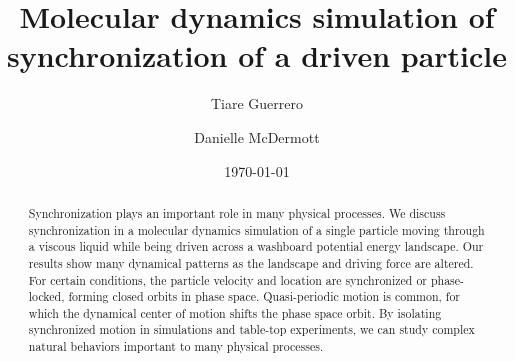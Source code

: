 \documentclass[preprint,showpacs,preprintnumbers,amsmath,amssymb,aps,prb]{revtex4-1}
\theoremstyle{remark}
\begin{document}
\title{Molecular dynamics simulation of synchronization of a  driven particle}
 
\author{Tiare Guerrero}

\author{Danielle McDermott}

\date{\today}

\begin{abstract}
  Synchronization
  plays an important role in many physical processes.
  We discuss synchronization in a 
  molecular dynamics simulation
  of a single particle
  moving through
  a viscous liquid
  while being driven 
  across a washboard potential energy landscape.
  Our results show many dynamical patterns
  as the landscape and driving force are altered.
  For certain conditions,
  the particle velocity and location
  are synchronized or 
  phase-locked,
  forming closed orbits in phase space.
  Quasi-periodic motion is common, 
  for which the
  dynamical center of motion shifts the
  phase space orbit.
  By 
  isolating
  synchronized motion
  in 
  simulations and table-top experiments,
  we 
  can study %
  complex natural behaviors
  important to many physical processes.
\end{abstract}

\maketitle 
\end{document}
